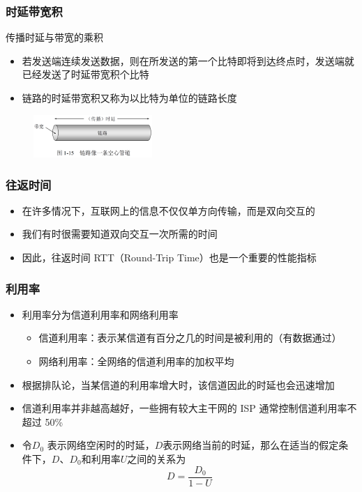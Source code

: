 \documentclass[cs4size,a4paper,10pt]{ctexart}
\begin{document}
	\subsubsection{时延带宽积}
	传播时延与带宽的乘积
	\begin{itemize}
		\item 若发送端连续发送数据，则在所发送的第一个比特即将到达终点时，发送端就已经发送了时延带宽积个比特
		\item 链路的时延带宽积又称为以比特为单位的链路长度
	\end{itemize}

	\begin{figure}[H]
		\centering
		\includegraphics[width=0.4\textwidth]{img/1.15}
	\end{figure}

	\subsubsection{往返时间}
	\begin{itemize}
		\item 在许多情况下，互联网上的信息不仅仅单方向传输，而是双向交互的
		\item 我们有时很需要知道双向交互一次所需的时间
		\item 因此，往返时间 RTT（Round-Trip Time）也是一个重要的性能指标
	\end{itemize}

	\subsubsection{利用率}
	\begin{itemize}
		\item 利用率分为信道利用率和网络利用率
		\begin{itemize}
			\item 信道利用率：表示某信道有百分之几的时间是被利用的（有数据通过）
			\item 网络利用率：全网络的信道利用率的加权平均
		\end{itemize}
		\item 根据排队论，当某信道的利用率增大时，该信道因此的时延也会迅速增加
		\item 信道利用率并非越高越好，一些拥有较大主干网的 ISP 通常控制信道利用率不超过 50\%
		\item 令$D_0$ 表示网络空闲时的时延，$D$表示网络当前的时延，那么在适当的假定条件下，$D$、$D_0$和利用率$U$之间的关系为$$D=\frac{D_0}{1-U}$$
	\end{itemize}
\end{document}
